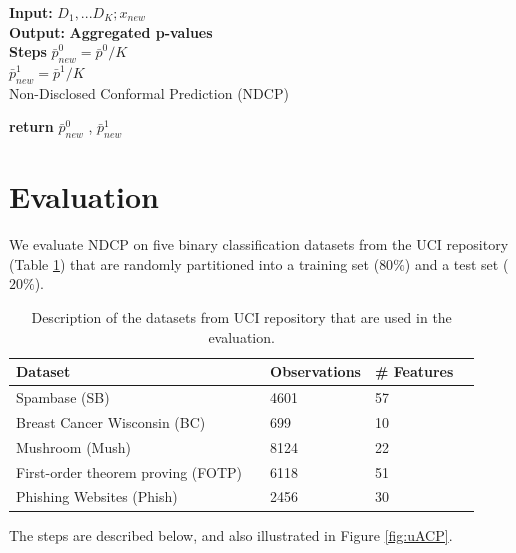 \documentclass[preprint,12pt,authoryear]{elsarticle}
\begin{document}
 \begin{algorithm}[H]
 \textbf{Input:}{ $D_1,...D_K  ;  x_{new}$}\\
 \textbf{Output:}{\textbf{ Aggregated p-values} }\\
 \textbf{Steps\;}
$\bar{p}_{new}^0 = \bar{p}^0 / K$\\   
$\bar{p}_{new}^1 = \bar{p}^1 / K$\\   
 \caption{Non-Disclosed Conformal Prediction (NDCP)} \label{algo:NDCP}
 \textbf{return} $\bar{p}_{new}^0$ , $\bar{p}_{new}^1$
 \end{algorithm}
 



\section{Evaluation}

We evaluate NDCP on five binary classification datasets from the UCI repository (Table \ref{tab:datasets}) that are randomly partitioned into a training set ($80\%$) and a test set ($20\%$). 

\begin{table} [H]
\caption{Description of the datasets from UCI repository that are used in the evaluation.} \centering
\vspace{1em}
\begin{tabular}{llllc}
\toprule
Dataset && Observations & \# Features \\
\midrule
Spambase (SB) & & 4601 & 57 \\
\hline
Breast Cancer Wisconsin (BC)  & & 699 & 10 \\
\hline
Mushroom (Mush)& & 8124 & 22 \\
\hline
 First-order theorem proving (FOTP) & & 6118 & 51 \\
\hline
Phishing Websites (Phish) & & 2456 & 30 \\
\bottomrule
\end{tabular}\label{tab:datasets}
\end{table}

The steps are described below, and also illustrated in Figure \ref{fig:uACP}.
\end{document}
